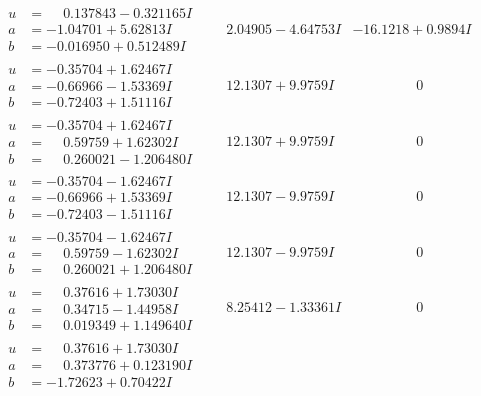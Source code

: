 \documentclass[1p]{elsarticle_modified}
\theoremstyle{definition}
\begin{document}
$$\begin{array}{c|c|c}
\begin{aligned}
u &= \phantom{-}0.137843 - 0.321165 I \\
a &= -1.04701 + 5.62813 I \\
b &= -0.016950 + 0.512489 I\end{aligned}
 & \phantom{-}2.04905 - 4.64753 I & -16.1218 + 0.9894 I \\ \hline\begin{aligned}
u &= -0.35704 + 1.62467 I \\
a &= -0.66966 - 1.53369 I \\
b &= -0.72403 + 1.51116 I\end{aligned}
 & \phantom{-}12.1307 + 9.9759 I & \phantom{-0.000000 } 0 \\ \hline\begin{aligned}
u &= -0.35704 + 1.62467 I \\
a &= \phantom{-}0.59759 + 1.62302 I \\
b &= \phantom{-}0.260021 - 1.206480 I\end{aligned}
 & \phantom{-}12.1307 + 9.9759 I & \phantom{-0.000000 } 0 \\ \hline\begin{aligned}
u &= -0.35704 - 1.62467 I \\
a &= -0.66966 + 1.53369 I \\
b &= -0.72403 - 1.51116 I\end{aligned}
 & \phantom{-}12.1307 - 9.9759 I & \phantom{-0.000000 } 0 \\ \hline\begin{aligned}
u &= -0.35704 - 1.62467 I \\
a &= \phantom{-}0.59759 - 1.62302 I \\
b &= \phantom{-}0.260021 + 1.206480 I\end{aligned}
 & \phantom{-}12.1307 - 9.9759 I & \phantom{-0.000000 } 0 \\ \hline\begin{aligned}
u &= \phantom{-}0.37616 + 1.73030 I \\
a &= \phantom{-}0.34715 - 1.44958 I \\
b &= \phantom{-}0.019349 + 1.149640 I\end{aligned}
 & \phantom{-}8.25412 - 1.33361 I & \phantom{-0.000000 } 0 \\ \hline\begin{aligned}
u &= \phantom{-}0.37616 + 1.73030 I \\
a &= \phantom{-}0.373776 + 0.123190 I \\
b &= -1.72623 + 0.70422 I\end{aligned}

\end{array}$$
\end{document}

